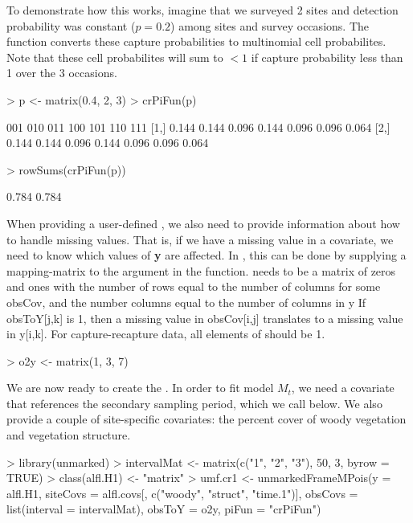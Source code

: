 \documentclass[a4paper]{article}
\renewenvironment{Schunk}{\vspace{\topsep}}{\vspace{\topsep}}
\begin{document}
To demonstrate how this works, imagine that we surveyed 2 sites and
detection probability was constant ($p=0.2$) among sites and survey
occasions. The function converts these capture probabilities to
multinomial cell probabilites. Note that these cell probabilites will
sum to $< 1$ if capture probability less than 1 over the 3 occasions.

\begin{Schunk}
\begin{Sinput}
> p <- matrix(0.4, 2, 3)
> crPiFun(p)
\end{Sinput}
\begin{Soutput}
       001   010   011   100   101   110   111
[1,] 0.144 0.144 0.096 0.144 0.096 0.096 0.064
[2,] 0.144 0.144 0.096 0.144 0.096 0.096 0.064
\end{Soutput}
\begin{Sinput}
> rowSums(crPiFun(p))
\end{Sinput}
\begin{Soutput}
[1] 0.784 0.784
\end{Soutput}
\end{Schunk}

When providing a user-defined , we also need to provide
information about how to handle missing values. That is, if we have a
missing value in a covariate, we need to know which values of {\bf y}
are affected. In , this can be done by supplying a
mapping-matrix to the  argument in the
 function.  needs to be a matrix
of zeros and ones with
the number of rows equal to the number of columns for some obsCov, and
the number columns equal to the number of columns in y
If obsToY[j,k] is 1, then a missing value in obsCov[i,j] translates to
a missing value in y[i,k]. For capture-recapture data, all elements of
 should be 1.

\begin{Schunk}
\begin{Sinput}
> o2y <- matrix(1, 3, 7)
\end{Sinput}
\end{Schunk}

We are now ready to create the . In order to fit
model $M_t$, we need a covariate that references the secondary sampling
period, which we call  below. We also provide a
couple of site-specific covariates: the percent cover of woody
vegetation and vegetation structure.

\begin{Schunk}
\begin{Sinput}
> library(unmarked)
> intervalMat <- matrix(c("1", "2", "3"), 50, 3, byrow = TRUE)
> class(alfl.H1) <- "matrix"
> umf.cr1 <- unmarkedFrameMPois(y = alfl.H1, siteCovs = alfl.covs[, 
     c("woody", "struct", "time.1")], obsCovs = list(interval = intervalMat), 
     obsToY = o2y, piFun = "crPiFun")
\end{Sinput}
\end{Schunk}
\end{document}
